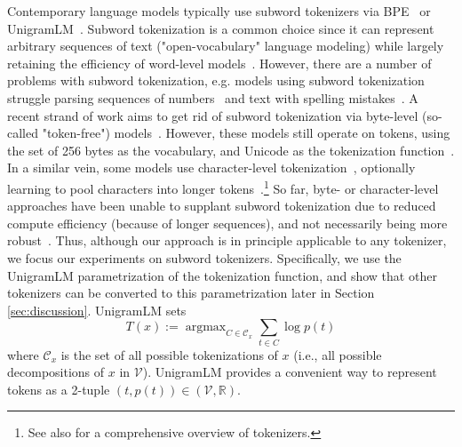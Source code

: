 \documentclass{article}
\DeclareMathOperator*{\argmax}{argmax}
\begin{document}
Contemporary language models typically use subword tokenizers via BPE~\citep{sennrich-etal-2016-neural} or UnigramLM~\citep{kudo-2018-subword}. Subword tokenization is a common choice since it can represent arbitrary sequences of text ("open-vocabulary" language modeling) while largely retaining the efficiency of word-level models~\citep{mielke2021words}. However, there are a number of problems with subword tokenization, e.g. models using subword tokenization struggle parsing sequences of numbers~\citep{golkar2023xval} and text with spelling mistakes~\citep{xue-etal-2022-byt5}. A recent strand of work aims to get rid of subword tokenization via byte-level (so-called "token-free") models~\citep{xue-etal-2022-byt5,yu2023megabyte}. However, these models still operate on tokens, using the set of 256 bytes as the vocabulary, and Unicode as the tokenization function~\citep{mielke2021words}. In a similar vein, some models use character-level tokenization~\citep{tay2022charformer,clark-etal-2022-canine}, optionally learning to pool characters into longer tokens~\citep{nawrot-etal-2023-efficient}.\footnote{See also \citet{mielke2021words} for a comprehensive overview of tokenizers.} So far, byte- or character-level approaches have been unable to supplant subword tokenization due to reduced compute efficiency (because of longer sequences), and not necessarily being more robust~\citep{libovicky-etal-2022-dont}. Thus, although our approach is in principle applicable to any tokenizer, we focus our experiments on subword tokenizers. Specifically, we use the UnigramLM parametrization of the tokenization function, and show that other tokenizers can be converted to this parametrization later in Section \ref{sec:discussion}. UnigramLM sets 
\[T(x) := \argmax_{C \in \mathcal{C}_x} \sum_{t \in C} \log p(t)\]
where $\mathcal{C}_x$ is the set of all possible tokenizations of $x$ (i.e., all possible decompositions of $x$ in $\mathcal{V}$). UnigramLM provides a convenient way to represent tokens as a 2-tuple \((t, p(t)) \in (\mathcal{V}, \mathbb{R})\).
\end{document}
